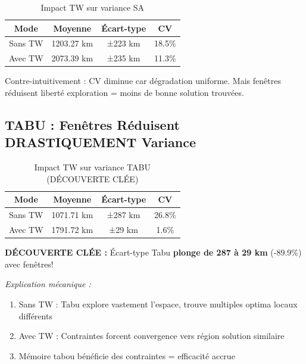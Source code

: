 \documentclass[12pt,a4paper,twoside]{report}
\begin{document}
\begin{table}[H]
    \centering
    \caption{Impact TW sur variance SA}
    \begin{tabular}{|c|c|c|c|}
        \hline
        \textbf{Mode} & \textbf{Moyenne} & \textbf{Écart-type} & \textbf{CV} \\
        \hline
        Sans TW       & 1203.27 km       & ±223 km             & 18.5\%      \\
        Avec TW       & 2073.39 km       & ±235 km             & 11.3\%      \\
        \hline
    \end{tabular}
\end{table}

Contre-intuitivement : CV diminue car dégradation uniforme. Mais fenêtres
réduisent liberté exploration = moins de bonne solution trouvées.

\subsection{TABU : Fenêtres Réduisent DRASTIQUEMENT Variance}

\begin{table}[H]
    \centering
    \caption{Impact TW sur variance TABU (DÉCOUVERTE CLÉE)}
    \begin{tabular}{|c|c|c|c|}
        \hline
        \textbf{Mode} & \textbf{Moyenne} & \textbf{Écart-type} & \textbf{CV} \\
        \hline
        Sans TW       & 1071.71 km       & ±287 km             & 26.8\%      \\
        Avec TW       & 1791.72 km       & ±29 km              & 1.6\%       \\
        \hline
    \end{tabular}
\end{table}

\textbf{DÉCOUVERTE CLÉE :} Écart-type Tabu \textbf{plonge de 287 à 29 km} (-89.9\%) avec fenêtres!

\textit{Explication mécanique :}
\begin{enumerate}
    \item Sans TW : Tabu explore vastement l'espace, trouve multiples optima locaux
          différents
    \item Avec TW : Contraintes forcent convergence vers région solution similaire
    \item Mémoire tabou bénéficie des contraintes = efficacité accrue
\end{enumerate}
\end{document}
